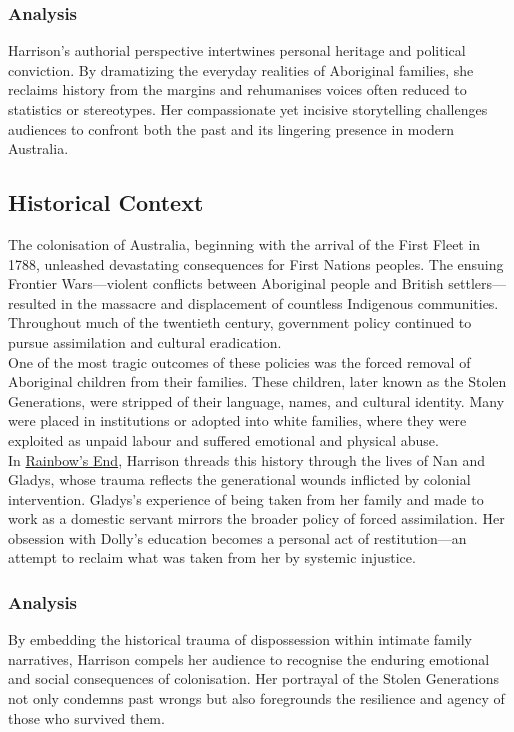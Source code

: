 \documentclass[a4paper]{article}
\begin{document}
\subsubsection{Analysis}
Harrison’s authorial perspective intertwines personal heritage and political conviction. By dramatizing the everyday realities of Aboriginal families, she reclaims history from the margins and rehumanises voices often reduced to statistics or stereotypes. Her compassionate yet incisive storytelling challenges audiences to confront both the past and its lingering presence in modern Australia.\\


\subsection{Historical Context}
The colonisation of Australia, beginning with the arrival of the First Fleet in 1788, unleashed devastating consequences for First Nations peoples. The ensuing Frontier Wars—violent conflicts between Aboriginal people and British settlers—resulted in the massacre and displacement of countless Indigenous communities. Throughout much of the twentieth century, government policy continued to pursue assimilation and cultural eradication.\\

One of the most tragic outcomes of these policies was the forced removal of Aboriginal children from their families. These children, later known as the Stolen Generations, were stripped of their language, names, and cultural identity. Many were placed in institutions or adopted into white families, where they were exploited as unpaid labour and suffered emotional and physical abuse.\\

In \underline{Rainbow's End}, Harrison threads this history through the lives of Nan and Gladys, whose trauma reflects the generational wounds inflicted by colonial intervention. Gladys’s experience of being taken from her family and made to work as a domestic servant mirrors the broader policy of forced assimilation. Her obsession with Dolly’s education becomes a personal act of restitution—an attempt to reclaim what was taken from her by systemic injustice.\\

\subsubsection{Analysis}
By embedding the historical trauma of dispossession within intimate family narratives, Harrison compels her audience to recognise the enduring emotional and social consequences of colonisation. Her portrayal of the Stolen Generations not only condemns past wrongs but also foregrounds the resilience and agency of those who survived them.\\
\end{document}
